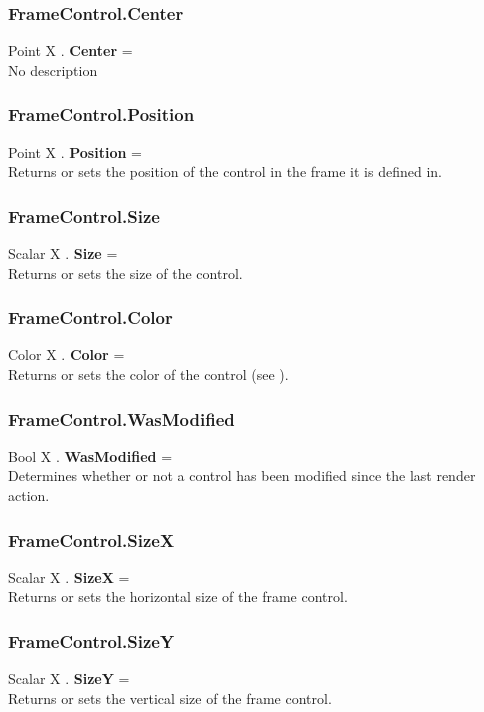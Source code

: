 \subsubsection{FrameControl.Center \label{F:FrameControl:Center}}
Point X . \textbf{Center} = \\
No description

\subsubsection{FrameControl.Position \label{F:FrameControl:Position}}
Point X . \textbf{Position} = \\
Returns or sets the position of the control in the frame it is defined in.

\subsubsection{FrameControl.Size \label{F:FrameControl:Size}}
Scalar X . \textbf{Size} = \\
Returns or sets the size of the control.

\subsubsection{FrameControl.Color \label{F:FrameControl:Color}}
Color X . \textbf{Color} = \\
Returns or sets the color of the control (see ).

\subsubsection{FrameControl.WasModified \label{F:FrameControl:WasModified}}
Bool X . \textbf{WasModified} = \\
Determines whether or not a control has been modified since the last render action.

\subsubsection{FrameControl.SizeX \label{F:FrameControl:SizeX}}
Scalar X . \textbf{SizeX} = \\
Returns or sets the horizontal size of the frame control.

\subsubsection{FrameControl.SizeY \label{F:FrameControl:SizeY}}
Scalar X . \textbf{SizeY} = \\
Returns or sets the vertical size of the frame control.


